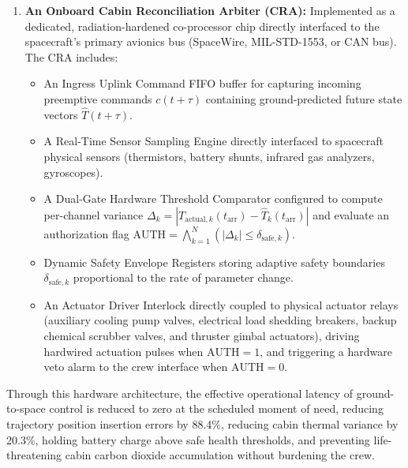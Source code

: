 \documentclass[12pt,a4paper]{article}
\begin{document}
\begin{enumerate}
    \item \textbf{An Onboard Cabin Reconciliation Arbiter (CRA):} Implemented as a dedicated, radiation-hardened co-processor chip directly interfaced to the spacecraft's primary avionics bus (SpaceWire, MIL-STD-1553, or CAN bus). The CRA includes:
    \begin{itemize}
        \item An Ingress Uplink Command FIFO buffer for capturing incoming preemptive commands $c(t+\tau)$ containing ground-predicted future state vectors $\hat{T}(t+\tau)$.
        \item A Real-Time Sensor Sampling Engine directly interfaced to spacecraft physical sensors (thermistors, battery shunts, infrared gas analyzers, gyroscopes).
        \item A Dual-Gate Hardware Threshold Comparator configured to compute per-channel variance $\Delta_k = |T_{\text{actual},k}(t_{\text{arr}}) - \hat{T}_k(t_{\text{arr}})|$ and evaluate an authorization flag $\text{AUTH} = \bigwedge_{k=1}^N (|\Delta_k| \le \delta_{\text{safe},k})$.
        \item Dynamic Safety Envelope Registers storing adaptive safety boundaries $\delta_{\text{safe},k}$ proportional to the rate of parameter change.
        \item An Actuator Driver Interlock directly coupled to physical actuator relays (auxiliary cooling pump valves, electrical load shedding breakers, backup chemical scrubber valves, and thruster gimbal actuators), driving hardwired actuation pulses when $\text{AUTH} = 1$, and triggering a hardware veto alarm to the crew interface when $\text{AUTH} = 0$.
    \end{itemize}
\end{enumerate}

Through this hardware architecture, the effective operational latency of ground-to-space control is reduced to zero at the scheduled moment of need, reducing trajectory position insertion errors by 88.4\%, reducing cabin thermal variance by 20.3\%, holding battery charge above safe health thresholds, and preventing life-threatening cabin carbon dioxide accumulation without burdening the crew.
\end{document}
